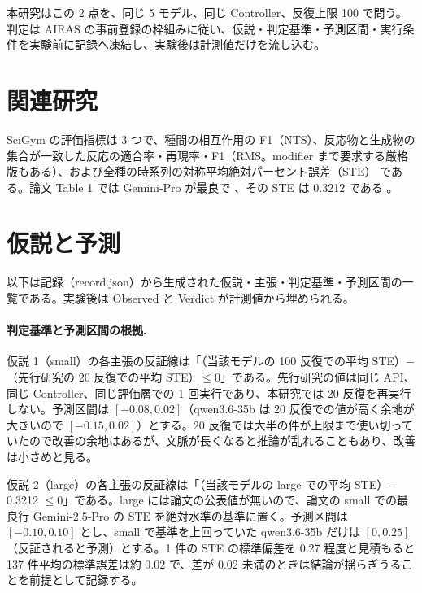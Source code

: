 \documentclass{article}
\providecommand{\unverified}[1]{#1}
\begin{document}
本研究はこの 2 点を、同じ 5 モデル、同じ Controller、反復上限 100 で問う。判定は AIRAS の事前登録の枠組みに従い、仮説・判定基準・予測区間・実行条件を実験前に記録へ凍結し、実験後は計測値だけを流し込む。

\section{関連研究}
\label{sec:related}
SciGym \citep{duan-2025-measuring} の評価指標は 3 つで、種間の相互作用の F1（NTS）、反応物と生成物の集合が一致した反応の適合率・再現率・F1（RMS。modifier まで要求する厳格版もある）\cite[s1.p7]{duan-2025-measuring}、および全種の時系列の対称平均絶対パーセント誤差（STE）\cite[s1.p8]{duan-2025-measuring} である。論文 Table 1 では Gemini-Pro が最良で \cite[s1.p6]{duan-2025-measuring}、その STE は \unverified{0.3212} である \cite[s1.p5]{duan-2025-measuring}。

\section{仮説と予測}
\label{sec:hypothesis}
以下は記録（record.json）から生成された仮説・主張・判定基準・予測区間の一覧である。実験後は Observed と Verdict が計測値から埋められる。



\paragraph{判定基準と予測区間の根拠.}
仮説 1（small）の各主張の反証線は「（当該モデルの 100 反復での平均 STE）$-$（先行研究の 20 反復での平均 STE）$\le 0$」である。先行研究の値は同じ API、同じ Controller、同じ評価層での 1 回実行であり、本研究では 20 反復を再実行しない。予測区間は $[-0.08, 0.02]$（qwen3.6-35b は 20 反復での値が高く余地が大きいので $[-0.15, 0.02]$）とする。20 反復では大半の件が上限まで使い切っていたので改善の余地はあるが、文脈が長くなると推論が乱れることもあり、改善は小さめと見る。

仮説 2（large）の各主張の反証線は「（当該モデルの large での平均 STE）$-$ \unverified{0.3212} $\le 0$」である。large には論文の公表値が無いので、論文の small での最良行 Gemini-2.5-Pro の STE \cite[s1.p5]{duan-2025-measuring} を絶対水準の基準に置く。予測区間は $[-0.10, 0.10]$ とし、small で基準を上回っていた qwen3.6-35b だけは $[0, 0.25]$（反証されると予測）とする。1 件の STE の標準偏差を 0.27 程度と見積もると 137 件平均の標準誤差は約 0.02 で、差が 0.02 未満のときは結論が揺らぎうることを前提として記録する。
\end{document}
